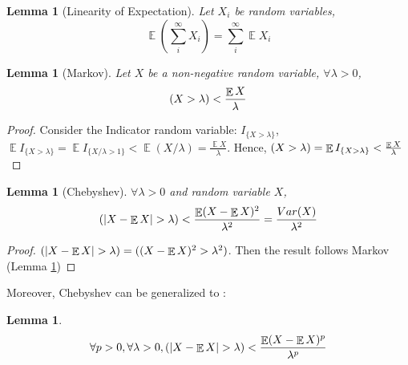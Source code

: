 \documentclass[11pt]{article}
\theoremstyle{plain}
\newtheorem{lemma}[theorem]{Lemma}
\DeclareMathOperator*{\E}{\mathbb{E}}
\let\Pr\relax
\DeclareMathOperator*{\Pr}{\mathbb{P}}
\begin{document}
\begin{lemma} [Linearity of Expectation]
\label{le:linearityofe}
	Let $X_i$ be random variables, 
	\[
	\E(\sum_i^{\infty} X_i)=\sum_i^{\infty} \E X_i
	\]
\end{lemma}

\begin{lemma} [Markov]
\label{le:markov}
Let $X$ be a non-negative random variable, $\forall \lambda>0$, 
\[
\Pr(X>\lambda)<\frac{\E X}{\lambda}
\]
\end{lemma}
\begin{proof}
	Consider the Indicator random variable: $I_{\{X>\lambda\}}$,  $\E 
	I_{\{X>\lambda\}}=\E I_{\{X/\lambda>1\}}<\E(X/\lambda)=\frac{\E 
	X}{\lambda}$. Hence, $\Pr(X>\lambda)=\E 
	I_{\{X>\lambda\}}<\frac{\E X}{\lambda}$
\end{proof}

\begin{lemma}[Chebyshev]
	\label{le:chebyshev}
	$\forall \lambda>0$ and random variable $X$,
	\[
	 \Pr(|X-\E X| > \lambda)<\frac{\E(X-\E 
	 X)^2}{\lambda^2}=\frac{Var(X)}{\lambda^2}
	\]
\end{lemma}

\begin{proof}
	$\Pr(|X-\E X|>\lambda)=\Pr((X-\E X)^2>\lambda^2)$. Then the result 
	follows Markov (Lemma  \ref{le:markov})
\end{proof}

Moreover, Chebyshev can be generalized to :

\begin{lemma}
\[
\forall p>0, \forall \lambda>0, \Pr(|X-\E X| > \lambda)<\frac{\E(X-\E 
	X)^p}{\lambda^p}
\]
\end{lemma}
\end{document}
